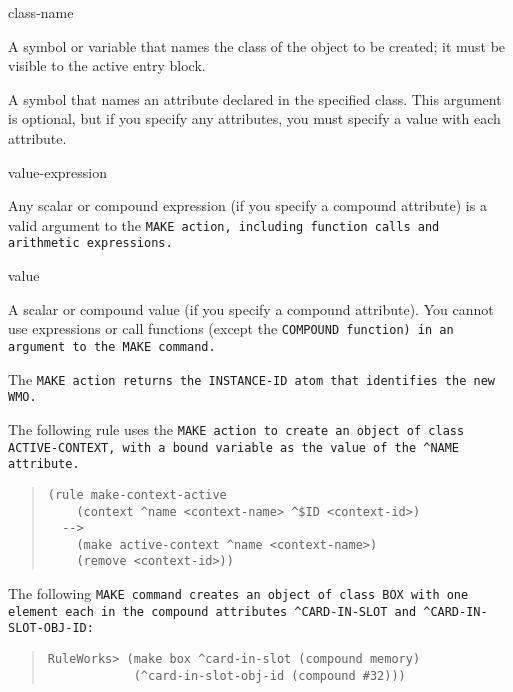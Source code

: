 \begin{arguments}
\item[class-name]

  A symbol or variable that names the class of the object to be
  created; it must be visible to the active entry block.

\item[\ct{attribute}]

  A symbol that names an attribute declared in the specified
  class. This argument is optional, but if you specify any attributes,
  you must specify a value with each attribute.

\item[value-expression]

  Any scalar or compound expression (if you specify a compound
  attribute) is a valid argument to the \tt{MAKE} action, including
  function calls and arithmetic expressions.

\item[value]

  A scalar or compound value (if you specify a compound
  attribute). You cannot use expressions or call functions (except the
  \tt{COMPOUND} function) in an argument to the \tt{MAKE} command.
\end{arguments}

\ReturnValue

The \tt{MAKE} action returns the \tt{INSTANCE-ID} atom that identifies
the new WMO.

\Example

The following rule uses the \tt{MAKE} action to create an object of
class \tt{ACTIVE-CONTEXT}, with a bound variable as the value of the
\verb|^NAME| attribute.

\begin{quote}
\begin{verbatim}
(rule make-context-active
    (context ^name <context-name> ^$ID <context-id>)
  -->
    (make active-context ^name <context-name>)
    (remove <context-id>))
\end{verbatim}
\end{quote}

The following \tt{MAKE} command creates an object of class \tt{BOX}
with one element each in the compound attributes \verb|^CARD-IN-SLOT|
and \verb|^CARD-IN-SLOT-OBJ-ID|:

\begin{quote}
\begin{verbatim}
RuleWorks> (make box ^card-in-slot (compound memory)
            (^card-in-slot-obj-id (compound #32)))
\end{verbatim}
\end{quote}

